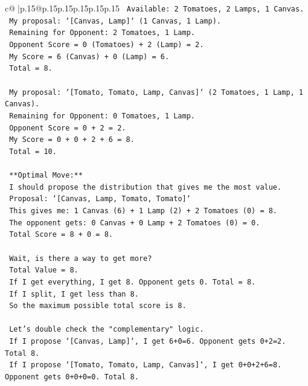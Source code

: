 \documentclass{article}
\begin{document}
{\begin{supertabular}{c@{$\;$}|p{.15\linewidth}@{}p{.15\linewidth}p{.15\linewidth}p{.15\linewidth}p{.15\linewidth}p{.15\linewidth}}
{{{\texttt{    Available: 2 Tomatoes, 2 Lamps, 1 Canvas.} \\
\texttt{    My proposal: `{[}Canvas, Lamp{]}` (1 Canvas, 1 Lamp).} \\
\texttt{    Remaining for Opponent: 2 Tomatoes, 1 Lamp.} \\
\texttt{    Opponent Score = 0 (Tomatoes) + 2 (Lamp) = 2.} \\
\texttt{    My Score = 6 (Canvas) + 0 (Lamp) = 6.} \\
\texttt{    Total = 8.} \\
\\ 
\texttt{    My proposal: `{[}Tomato, Tomato, Lamp, Canvas{]}` (2 Tomatoes, 1 Lamp, 1 Canvas).} \\
\texttt{    Remaining for Opponent: 0 Tomatoes, 1 Lamp.} \\
\texttt{    Opponent Score = 0 + 2 = 2.} \\
\texttt{    My Score = 0 + 0 + 2 + 6 = 8.} \\
\texttt{    Total = 10.} \\
\\ 
\texttt{    **Optimal Move:**} \\
\texttt{    I should propose the distribution that gives me the most value.} \\
\texttt{    Proposal: `{[}Canvas, Lamp, Tomato, Tomato{]}`} \\
\texttt{    This gives me: 1 Canvas (6) + 1 Lamp (2) + 2 Tomatoes (0) = 8.} \\
\texttt{    The opponent gets: 0 Canvas + 0 Lamp + 2 Tomatoes (0) = 0.} \\
\texttt{    Total Score = 8 + 0 = 8.} \\
\\ 
\texttt{    Wait, is there a way to get more?} \\
\texttt{    Total Value = 8.} \\
\texttt{    If I get everything, I get 8. Opponent gets 0. Total = 8.} \\
\texttt{    If I split, I get less than 8.} \\
\texttt{    So the maximum possible total score is 8.} \\
\\ 
\texttt{    Let's double check the "complementary" logic.} \\
\texttt{    If I propose `{[}Canvas, Lamp{]}`, I get 6+0=6. Opponent gets 0+2=2. Total 8.} \\
\texttt{    If I propose `{[}Tomato, Tomato, Lamp, Canvas{]}`, I get 0+0+2+6=8. Opponent gets 0+0+0=0. Total 8.} \\
}}}
\end{supertabular}}
\end{document}
